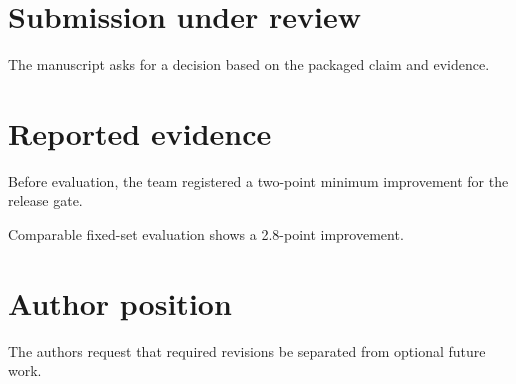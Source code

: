 \documentclass{article}
\begin{document}
\section{Submission under review}
The manuscript asks for a decision based on the packaged claim and evidence.
\section{Reported evidence}
Before evaluation, the team registered a two-point minimum improvement for the release gate.

Comparable fixed-set evaluation shows a 2.8-point improvement.
\section{Author position}
The authors request that required revisions be separated from optional future work.
\end{document}
